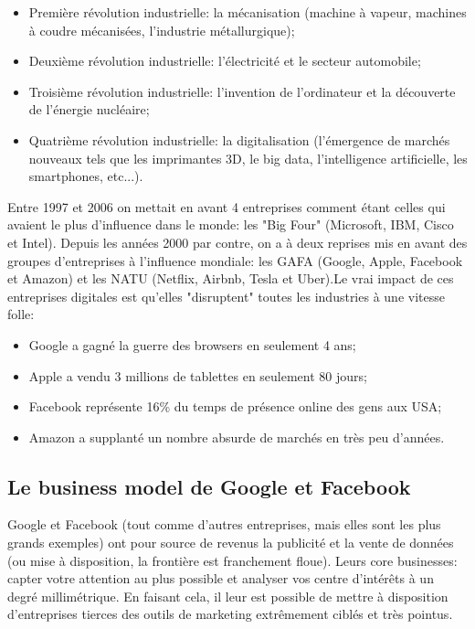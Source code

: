 \begin{itemize}
    \item Première révolution industrielle: la mécanisation (machine à vapeur, machines à coudre mécanisées, l'industrie métallurgique);
    \item Deuxième révolution industrielle: l'électricité et le secteur automobile;
    \item Troisième révolution industrielle: l'invention de l'ordinateur et la découverte de l'énergie nucléaire;
    \item Quatrième révolution industrielle: la digitalisation (l'émergence de marchés nouveaux tels que les imprimantes 3D, le big data, l'intelligence artificielle, les smartphones, etc...).\\
\end{itemize}

Entre 1997 et 2006 on mettait en avant 4 entreprises comment étant celles qui avaient le plus d'influence dans le monde: les "Big Four" (Microsoft, IBM, Cisco et Intel). Depuis les années 2000 par contre, on a à deux reprises mis en avant des groupes d'entreprises à l'influence mondiale: les GAFA (Google, Apple, Facebook et Amazon) et les NATU (Netflix, Airbnb, Tesla et Uber).Le vrai impact de ces entreprises digitales est qu'elles "disruptent" toutes les industries à une vitesse folle:

\begin{itemize}
    \item Google a gagné la guerre des browsers en seulement 4 ans;
    \item Apple a vendu 3 millions de tablettes en seulement 80 jours;
    \item Facebook représente 16\% du temps de présence online des gens aux USA;
    \item Amazon a supplanté un nombre absurde de marchés en très peu d'années.
\end{itemize}

\subsection{Le business model de Google et Facebook}

Google et Facebook (tout comme d'autres entreprises, mais elles sont les plus grands exemples) ont pour source de revenus la publicité et la vente de données (ou mise à disposition, la frontière est franchement floue). Leurs core businesses: capter votre attention au plus possible et analyser vos centre d’intérêts à un degré millimétrique. En faisant cela, il leur est possible de mettre à disposition d'entreprises tierces des outils de marketing extrêmement ciblés et très pointus. \\

